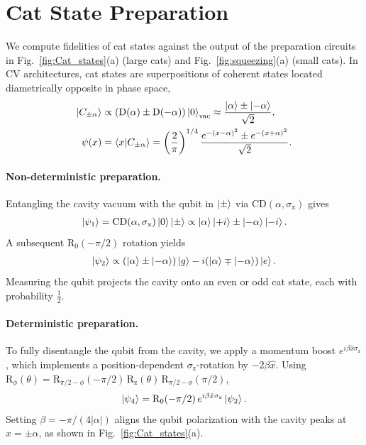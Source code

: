 \documentclass[aps,prx,showpacs,notitlepage,twocolumn,superscriptaddress,nofootinbib,preprintnumbers,floatfix,10pt, longbibliography]{revtex4-2}
\begin{document}
{\section{Cat State Preparation}\label{app:cat-prep}

We compute fidelities of cat states against the output of the preparation
circuits in Fig.~\ref{fig:Cat_states}(a) (large cats) and
Fig.~\ref{fig:squeezing}(a) (small cats).  In CV architectures, cat states
are superpositions of coherent states located diametrically opposite in
phase space,
\begin{align}
\ket{C_{\pm\alpha}}
  &\propto (\mathrm{D}(\alpha)\pm\mathrm{D}(-\alpha))\ket{0}_\mathrm{vac}
   \approx \frac{\ket{\alpha}\pm\ket{-\alpha}}{\sqrt{2}},\\
\psi(x)
  &= \braket{x|C_{\pm\alpha}}
   = \left(\frac{2}{\pi}\right)^{1/4}
     \frac{e^{-(x-\alpha)^2}\pm e^{-(x+\alpha)^2}}{\sqrt{2}}.
\end{align}

\paragraph{Non-deterministic preparation.}
Entangling the cavity vacuum with the qubit in $\ket{\pm}$ via
$\mathrm{CD}(\alpha,\sigma_\mathrm{x})$ gives
\begin{align}
\ket{\psi_1}
  = \mathrm{CD}(\alpha,\sigma_\mathrm{x})\ket{0}\ket{\pm}
  \propto \ket{\alpha}\ket{+i}\pm\ket{-\alpha}\ket{-i}.
  \label{eqn:entangled}
\end{align}
A subsequent $\mathrm{R}_0(-\pi/2)$ rotation yields
\begin{align}
\ket{\psi_2}
  \propto (\ket{\alpha}\pm\ket{-\alpha})\ket{g}
          - i(\ket{\alpha}\mp\ket{-\alpha})\ket{e}.
\end{align}
Measuring the qubit projects the cavity onto an even or odd cat state, each
with probability $\frac{1}{2}$.

\paragraph{Deterministic preparation.}
To fully disentangle the qubit from the cavity, we apply a momentum boost
$e^{i\beta\hat{x}\sigma_\mathrm{z}}$, which implements a position-dependent
$\sigma_\mathrm{z}$-rotation by $-2\beta\hat{x}$.  Using
$\mathrm{R}_\phi(\theta)=\mathrm{R}_{\pi/2-\phi}(-\pi/2)\,
\mathrm{R}_\mathrm{z}(\theta)\,\mathrm{R}_{\pi/2-\phi}(\pi/2)$,
\begin{align}
\ket{\psi_4}
  = \mathrm{R}_0(-\pi/2)\,e^{i\beta\hat{x}\sigma_\mathrm{z}}\ket{\psi_2}.
  \label{eqn:theta}
\end{align}
Setting $\beta=-\pi/(4|\alpha|)$ aligns the qubit polarization with the
cavity peaks at $x=\pm\alpha$, as shown in Fig.~\ref{fig:Cat_states}(a).

}
\end{document}
